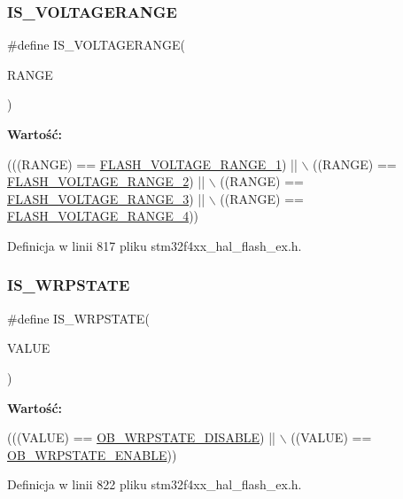 \subsubsection{\texorpdfstring{I\+S\+\_\+\+V\+O\+L\+T\+A\+G\+E\+R\+A\+N\+GE}{IS\_VOLTAGERANGE}}
{\footnotesize\ttfamily \#define I\+S\+\_\+\+V\+O\+L\+T\+A\+G\+E\+R\+A\+N\+GE(\begin{DoxyParamCaption}\item[{}]{R\+A\+N\+GE }\end{DoxyParamCaption})}

{\bfseries Wartość\+:}
\begin{DoxyCode}
(((RANGE) == \hyperlink{group___f_l_a_s_h_ex___voltage___range_ga5cadf49a63c968cde3b980e5139d398e}{FLASH\_VOLTAGE\_RANGE\_1}) || \(\backslash\)
                               ((RANGE) == \hyperlink{group___f_l_a_s_h_ex___voltage___range_gad047be2bc7aa9be946b5b0c6b3062ef3}{FLASH\_VOLTAGE\_RANGE\_2}) || \(\backslash\)
                               ((RANGE) == \hyperlink{group___f_l_a_s_h_ex___voltage___range_ga50950407a789684eec9216f49e0831a0}{FLASH\_VOLTAGE\_RANGE\_3}) || \(\backslash\)
                               ((RANGE) == \hyperlink{group___f_l_a_s_h_ex___voltage___range_gabf8037a482f18815c5a67f287223a658}{FLASH\_VOLTAGE\_RANGE\_4}))
\end{DoxyCode}


Definicja w linii 817 pliku stm32f4xx\+\_\+hal\+\_\+flash\+\_\+ex.\+h.

\mbox{\label{group___f_l_a_s_h_ex___i_s___f_l_a_s_h___definitions_ga8164622401a6cacf006679166de93c21}} 
\subsubsection{\texorpdfstring{I\+S\+\_\+\+W\+R\+P\+S\+T\+A\+TE}{IS\_WRPSTATE}}
{\footnotesize\ttfamily \#define I\+S\+\_\+\+W\+R\+P\+S\+T\+A\+TE(\begin{DoxyParamCaption}\item[{}]{V\+A\+L\+UE }\end{DoxyParamCaption})}

{\bfseries Wartość\+:}
\begin{DoxyCode}
(((VALUE) == \hyperlink{group___f_l_a_s_h_ex___w_r_p___state_gaa34eb6205fe554f65a311ee974d5a4ab}{OB\_WRPSTATE\_DISABLE}) || \(\backslash\)
                           ((VALUE) == \hyperlink{group___f_l_a_s_h_ex___w_r_p___state_ga9fc463145ab57616baa36d95523186a1}{OB\_WRPSTATE\_ENABLE}))
\end{DoxyCode}


Definicja w linii 822 pliku stm32f4xx\+\_\+hal\+\_\+flash\+\_\+ex.\+h.

